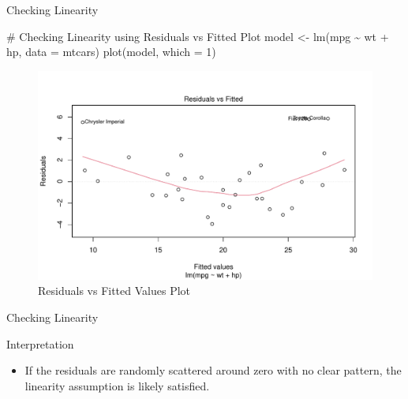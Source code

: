 \documentclass[
  18 pt,
  ignorenonframetext,
  aspectratio=1610,
]{beamer}
\newenvironment{Shaded}{\begin{snugshade}}{\end{snugshade}}
\newcommand{\AttributeTok}[1]{\textcolor[rgb]{0.40,0.45,0.13}{#1}}
\newcommand{\CommentTok}[1]{\textcolor[rgb]{0.37,0.37,0.37}{#1}}
\newcommand{\DecValTok}[1]{\textcolor[rgb]{0.68,0.00,0.00}{#1}}
\newcommand{\FunctionTok}[1]{\textcolor[rgb]{0.28,0.35,0.67}{#1}}
\newcommand{\NormalTok}[1]{\textcolor[rgb]{0.00,0.23,0.31}{#1}}
\newcommand{\OtherTok}[1]{\textcolor[rgb]{0.00,0.23,0.31}{#1}}
\newcommand{\SpecialCharTok}[1]{\textcolor[rgb]{0.37,0.37,0.37}{#1}}
\providecommand{\tightlist}{%
  \setlength{\itemsep}{0pt}\setlength{\parskip}{0pt}}\usepackage{longtable,booktabs,array}
\begin{document}
\begin{frame}[fragile]{Checking Linearity}
\protect\hypertarget{checking-linearity-1}{}
\tiny

\begin{Shaded}
\begin{Highlighting}[]
\CommentTok{\# Checking Linearity using Residuals vs Fitted Plot}
\NormalTok{model }\OtherTok{\textless{}{-}} \FunctionTok{lm}\NormalTok{(mpg }\SpecialCharTok{\textasciitilde{}}\NormalTok{ wt }\SpecialCharTok{+}\NormalTok{ hp, }\AttributeTok{data =}\NormalTok{ mtcars)}
\FunctionTok{plot}\NormalTok{(model, }\AttributeTok{which =} \DecValTok{1}\NormalTok{)}
\end{Highlighting}
\end{Shaded}

\begin{figure}

{\centering \includegraphics[width=\textwidth,height=0.5\textheight]{R-Regression_files/figure-beamer/unnamed-chunk-19-1.pdf}

}

\caption{Residuals vs Fitted Values Plot}

\end{figure}
\end{frame}

\begin{frame}{Checking Linearity}
\protect\hypertarget{checking-linearity-2}{}
\begin{block}{Interpretation}
\protect\hypertarget{interpretation-3}{}
\begin{itemize}
\tightlist
\item
  If the residuals are randomly scattered around zero with no clear
  pattern, the linearity assumption is likely satisfied.
\end{itemize}

\normalsize
\end{block}
\end{frame}
\end{document}
